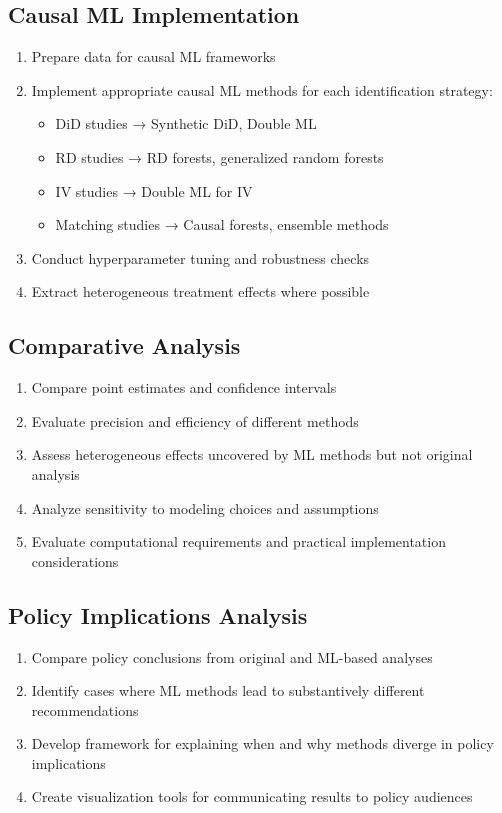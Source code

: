 \documentclass[12pt,a4paper]{article}
\begin{document}
\subsection{Causal ML Implementation}
\begin{enumerate}
    \item Prepare data for causal ML frameworks
    \item Implement appropriate causal ML methods for each identification strategy:
    \begin{itemize}
        \item DiD studies → Synthetic DiD, Double ML
        \item RD studies → RD forests, generalized random forests
        \item IV studies → Double ML for IV
        \item Matching studies → Causal forests, ensemble methods
    \end{itemize}
    \item Conduct hyperparameter tuning and robustness checks
    \item Extract heterogeneous treatment effects where possible
\end{enumerate}

\subsection{Comparative Analysis}
\begin{enumerate}
    \item Compare point estimates and confidence intervals
    \item Evaluate precision and efficiency of different methods
    \item Assess heterogeneous effects uncovered by ML methods but not original analysis
    \item Analyze sensitivity to modeling choices and assumptions
    \item Evaluate computational requirements and practical implementation considerations
\end{enumerate}

\subsection{Policy Implications Analysis}
\begin{enumerate}
    \item Compare policy conclusions from original and ML-based analyses
    \item Identify cases where ML methods lead to substantively different recommendations
    \item Develop framework for explaining when and why methods diverge in policy implications
    \item Create visualization tools for communicating results to policy audiences
\end{enumerate}
\end{document}
